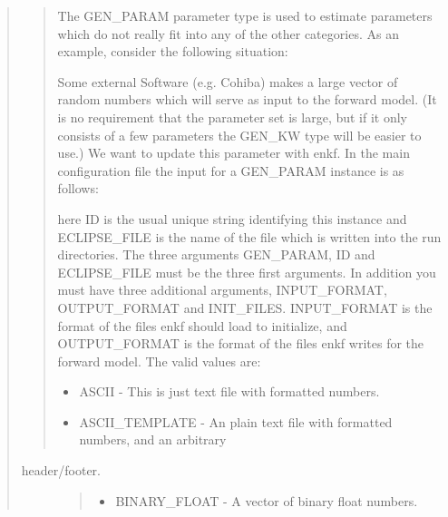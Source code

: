 \documentclass[a4paper,10pt,english]{sphinxmanual}
\begin{document}
\begin{sphinxShadowBox}
\begin{quote}
\begin{quote}

The GEN\_PARAM parameter type is used to estimate parameters which do not
really fit into any of the other categories. As an example, consider the
following situation:

Some external Software (e.g. Cohiba) makes a large vector of random numbers
which will serve as input to the forward model. (It is no requirement that the
parameter set is large, but if it only consists of a few parameters the GEN\_KW
type will be easier to use.) We want to update this parameter with enkf. In
the main configuration file the input for a GEN\_PARAM instance is as follows:

%
\begin{sphinxVerbatim}[commandchars=\\\{\}]
            
\end{sphinxVerbatim}

here ID is the usual unique string identifying this instance and ECLIPSE\_FILE
is the name of the file which is written into the run directories. The three
arguments GEN\_PARAM, ID and ECLIPSE\_FILE must be the three first arguments. In
addition you must have three additional arguments, INPUT\_FORMAT, OUTPUT\_FORMAT
and INIT\_FILES. INPUT\_FORMAT is the format of the files enkf should load to
initialize, and OUTPUT\_FORMAT is the format of the files enkf writes for the
forward model. The valid values are:
\begin{itemize}
\item {} 
ASCII - This is just text file with formatted numbers.

\item {} 
ASCII\_TEMPLATE - An plain text file with formatted numbers, and an arbitrary

\end{itemize}
\end{quote}
\begin{description}
\item[{header/footer.}] \leavevmode\begin{quote}
\begin{itemize}
\item {} 
BINARY\_FLOAT - A vector of binary float numbers.


\end{itemize}
\end{quote}
\end{description}
\end{quote}
\end{sphinxShadowBox}
\end{document}
